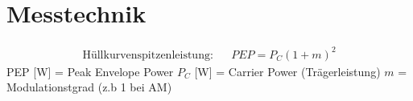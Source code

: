 \section*{Messtechnik}

\begin{tcolorbox}[colback=white]
    \begin{align*}
        \text{Hüllkurvenspitzenleistung:}      &  & PEP = P_C (1+m)^2
    \end{align*}
    \tcblower
    \small PEP [W] = Peak Envelope Power \hspace{0.5em} $P_C$ [W] = Carrier Power (Trägerleistung) \hspace{0.5em} $m$ = Modulationstgrad (z.b 1 bei AM)
\end{tcolorbox}